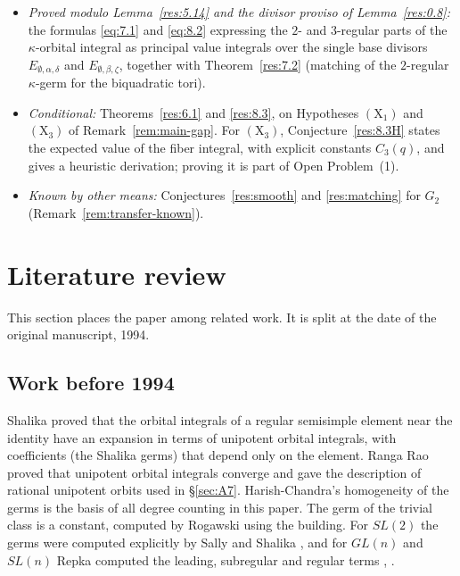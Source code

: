 \documentclass[12pt,letterpaper]{amsart}
\theoremstyle{plain}
\theoremstyle{definition}
\theoremstyle{remark}
\theoremstyle{definition}
\begin{document}
\begin{itemize}
\begin{enumerate}[(i)]
\[
E_{\emptyset,\beta,\zeta}(u_0)(F)\dashrightarrow(\mathbb{P}^1(K)\setminus\mathbb{P}^1(F))\times\mathcal C_K(F)
\]
onto a split quadric cone for the cyclic cubic tori
(Propositions~\ref{res:8.3F}--\ref{res:8.3G}); the list
of elliptic endoscopic data (Table~\ref{tab:A.6}); and the stability of the
$2$- and $3$-regular classes (\S\ref{sec:A7}).
\end{enumerate}
\item \emph{Proved modulo Lemma~\ref{res:5.14} and the divisor proviso of Lemma~\ref{res:0.8}:}
the formulas \eqref{eq:7.1} and \eqref{eq:8.2} expressing the $2$- and
$3$-regular parts of the $\kappa$-orbital integral as principal value
integrals over the single base divisors $E_{\emptyset,\alpha,\delta}$ and
$E_{\emptyset,\beta,\zeta}$, together with Theorem~\ref{res:7.2} (matching of
the $2$-regular $\kappa$-germ for the biquadratic tori).
\item \emph{Conditional:} Theorems~\ref{res:6.1} and \ref{res:8.3}, on
Hypotheses $(\mathrm X_1)$ and $(\mathrm X_3)$ of Remark~\ref{rem:main-gap}.
For $(\mathrm X_3)$, Conjecture~\ref{res:8.3H} states the expected value of the
fiber integral, with explicit constants $C_3(q)$, and gives a heuristic
derivation; proving it is part of Open Problem~(1).
\item \emph{Known by other means:} Conjectures~\ref{res:smooth} and
\ref{res:matching} for $G_2$ (Remark~\ref{rem:transfer-known}).
\end{itemize}
\section*{Literature review}
This section places the paper among related work. It is split at the date of
the original manuscript, 1994.

\subsection*{Work before 1994}

Shalika \cite{Sh72} proved that the orbital integrals of a regular semisimple
element near the identity have an expansion in terms of unipotent orbital
integrals, with coefficients (the Shalika germs) that depend only on the
element. Ranga Rao \cite{Ra72} proved that unipotent orbital integrals
converge and gave the description of rational unipotent orbits used in
\S\ref{sec:A7}. Harish-Chandra's homogeneity of the germs is the basis of all
degree counting in this paper. The germ of the trivial class is a constant,
computed by Rogawski \cite{Ro80} using the building. For $SL(2)$ the germs
were computed explicitly by Sally and Shalika \cite{SS83}, and for $GL(n)$ and
$SL(n)$ Repka computed the leading, subregular and regular terms \cite{Re84},
\cite{Re85}.
\end{document}
